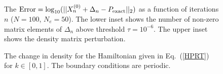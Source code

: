 \begin{figure}
\caption{\small  The 
${\rm Error} = \log_{10}(||X^{(0)}_n + \Delta_n - P_{\rm exact}||_2)$
as a function of iterations $n$ ($N = 100$, $N_e = 50$). The lower 
inset shows the number of non-zero matrix elements of $\Delta_n$ 
above threshold $\tau = 10^{-6}$.  The upper inset shows the density matrix
perturbation.
\label{DX}}
\end{figure}

\begin{figure}
\caption{\small The change in density for the Hamiltonian
given in Eq.\ (\ref{HPRT}) for $k \in [0,1]$. The boundary 
conditions are periodic.
\label{Fig2}}
\end{figure}


